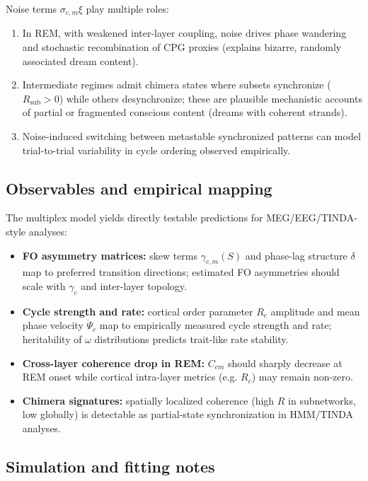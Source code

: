 \documentclass{article}
\begin{document}
Noise terms $\sigma_{c,m}\xi$ play multiple roles:
\begin{enumerate}
  \item In REM, with weakened inter-layer coupling, noise drives phase wandering and stochastic recombination of CPG proxies (explains bizarre, randomly associated dream content).
  \item Intermediate regimes admit chimera states where subsets synchronize ($R_{\text{sub}}>0$) while others desynchronize; these are plausible mechanistic accounts of partial or fragmented conscious content (dreams with coherent strands).
  \item Noise-induced switching between metastable synchronized patterns can model trial-to-trial variability in cycle ordering observed empirically.
\end{enumerate}

\subsection{Observables and empirical mapping}

The multiplex model yields directly testable predictions for MEG/EEG/TINDA-style analyses:
\begin{itemize}
  \item \textbf{FO asymmetry matrices:} skew terms $\gamma_{c,m}(S)$ and phase-lag structure $\delta$ map to preferred transition directions; estimated FO asymmetries should scale with $\gamma_c$ and inter-layer topology.
  \item \textbf{Cycle strength and rate:} cortical order parameter $R_c$ amplitude and mean phase velocity $\dot\Psi_c$ map to empirically measured cycle strength and rate; heritability of $\omega$ distributions predicts trait-like rate stability.
  \item \textbf{Cross-layer coherence drop in REM:} $C_{cm}$ should sharply decrease at REM onset while cortical intra-layer metrics (e.g. $R_c$) may remain non-zero.
  \item \textbf{Chimera signatures:} spatially localized coherence (high $R$ in subnetworks, low globally) is detectable as partial-state synchronization in HMM/TINDA analyses.
\end{itemize}

\subsection{Simulation and fitting notes}
\end{document}
